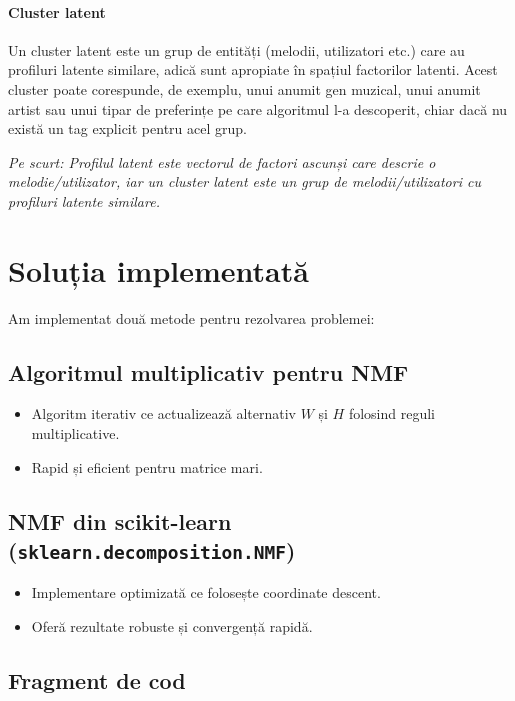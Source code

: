 \documentclass[12pt,a4paper]{article}
\begin{document}
	\paragraph{Cluster latent}
	Un cluster latent este un grup de entități (melodii, utilizatori etc.) care au profiluri latente similare, adică sunt apropiate în spațiul factorilor latenti. Acest cluster poate corespunde, de exemplu, unui anumit gen muzical, unui anumit artist sau unui tipar de preferințe pe care algoritmul l-a descoperit, chiar dacă nu există un tag explicit pentru acel grup.
	
	\vspace{0.5em}
	\textit{Pe scurt: Profilul latent este vectorul de factori ascunși care descrie o melodie/utilizator, iar un cluster latent este un grup de melodii/utilizatori cu profiluri latente similare.}
	\vspace{1em} %
	
	\section{Soluția implementată}
	
	Am implementat două metode pentru rezolvarea problemei:
	
	\subsection{Algoritmul multiplicativ pentru NMF}
	
	\begin{itemize}
		\item Algoritm iterativ ce actualizează alternativ $W$ și $H$ folosind reguli multiplicative.
		\item Rapid și eficient pentru matrice mari.
	\end{itemize}
	
	\subsection{NMF din scikit-learn (\texttt{sklearn.decomposition.NMF})}
	
	\begin{itemize}
		\item Implementare optimizată ce folosește coordinate descent.
		\item Oferă rezultate robuste și convergență rapidă.
	\end{itemize}
	
	\subsection*{Fragment de cod}
	
\end{document}
